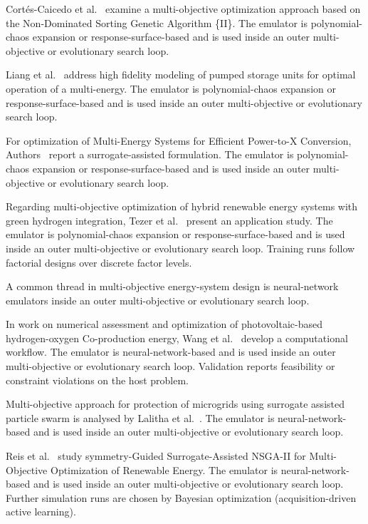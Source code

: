 Cortés-Caicedo et al.~\cite{cortes-caicedo_multi-objective_2025} examine a multi-objective optimization approach based on the Non-Dominated Sorting Genetic Algorithm \{II\}. The emulator is polynomial-chaos expansion or response-surface-based and is used inside an outer multi-objective or evolutionary search loop.

Liang et al.~\cite{liang_high_2024} address high fidelity modeling of pumped storage units for optimal operation of a multi-energy. The emulator is polynomial-chaos expansion or response-surface-based and is used inside an outer multi-objective or evolutionary search loop.

For optimization of Multi-Energy Systems for Efficient Power-to-X Conversion, Authors~\cite{malla_sg_optimization_2024} report a surrogate-assisted formulation. The emulator is polynomial-chaos expansion or response-surface-based and is used inside an outer multi-objective or evolutionary search loop.

Regarding multi-objective optimization of hybrid renewable energy systems with green hydrogen integration, Tezer et al.~\cite{tezer_multi-objective_2025} present an application study. The emulator is polynomial-chaos expansion or response-surface-based and is used inside an outer multi-objective or evolutionary search loop. Training runs follow factorial designs over discrete factor levels.

A common thread in multi-objective energy-system design is neural-network emulators inside an outer multi-objective or evolutionary search loop.

In work on numerical assessment and optimization of photovoltaic-based hydrogen-oxygen Co-production energy, Wang et al.~\cite{Wang2024} develop a computational workflow. The emulator is neural-network-based and is used inside an outer multi-objective or evolutionary search loop. Validation reports feasibility or constraint violations on the host problem.

Multi-objective approach for protection of microgrids using surrogate assisted particle swarm is analysed by Lalitha et al.~\cite{Lalitha20231401}. The emulator is neural-network-based and is used inside an outer multi-objective or evolutionary search loop.

Reis et al.~\cite{Reis2025} study symmetry-Guided Surrogate-Assisted NSGA-II for Multi-Objective Optimization of Renewable Energy. The emulator is neural-network-based and is used inside an outer multi-objective or evolutionary search loop. Further simulation runs are chosen by Bayesian optimization (acquisition-driven active learning).

